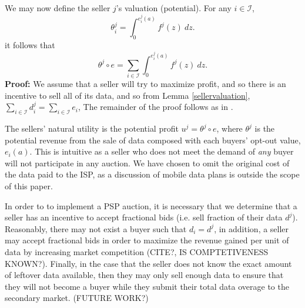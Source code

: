 \documentclass[12pt]{article}
\theoremstyle{definition}
\newcommand{\mcI}{\mathcal{I}}
\begin{document}
\begin{multicols}{2}
We may now define the seller $j$'s valuation (potential). 
{
\label{sellervaluation}
For any $i\in\mcI$, 
\begin{equation}\label{singlevaluation}
    \theta_i^j = \int_0^{e_i^j(a)} f^j(z) \ dz.
\end{equation}
it follows that 
\begin{equation}\label{valuation}
    \theta^j \circ e = \displaystyle\sum_{i\in\mcI}
 \int_0^{e_i^j(a)} f^j(z) \ dz.
\end{equation}
}
\textbf{Proof:} 
We assume that a seller will try to maximize profit, and
so there is an incentive to sell all of its data, and so from Lemma
\ref{sellervaluation},  $\sum_{i\in{\mcI}} d_i^j = 
\sum_{i\in\mcI} e_i$,
The remainder of the proof follows as in \cite{semret}.

The sellers' natural utility is the potential
profit $u^j = \theta^j\circ e$, where $\theta^j$ is the
potential revenue from the sale of data composed with each buyers' opt-out value, $e_i(a)$. 
This is intuitive as a seller who does not meet the demand of \emph{any} buyer will not
participate in any auction. We have chosen to omit the original cost of the data
paid to the ISP, as a discussion of mobile data plans is outside the scope of this
paper. 

In order to to implement a PSP auction, it is necessary that we determine 
that a seller has an incentive to
accept fractional bids (i.e. sell fraction of their data $d^j$). Reasonably,
there may not exist a buyer such that $d_i = d^j$, in addition, a seller may accept
fractional bids in order to
maximize the revenue gained per unit of data by increasing market competition
(CITE?, IS COMPTETIVENESS KNOWN?).
Finally, in the case that the seller does not know the exact amount of
leftover data available, then they may only sell enough data to ensure that
they will not become a buyer while they submit their total data overage to the
secondary market. (FUTURE WORK?)


\end{multicols}
\end{document}
